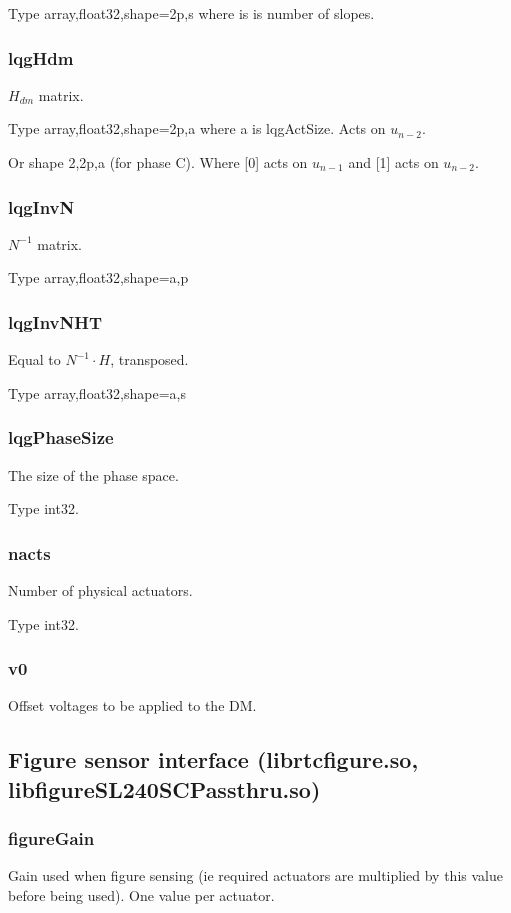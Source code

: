 \documentclass[a4,10pt]{article}
\begin{document}
Type array,float32,shape=2p,s where is is number of slopes.

\subsubsection{lqgHdm}
$H_{dm}$ matrix.

Type array,float32,shape=2p,a where a is lqgActSize.  Acts on $u_{n-2}$.

Or shape 2,2p,a (for phase C). Where [0] acts on $u_{n-1}$ and [1]
acts on $u_{n-2}$.

\subsubsection{lqgInvN}
$N^{-1}$ matrix.

Type array,float32,shape=a,p

\subsubsection{lqgInvNHT}
Equal to $N^{-1}\cdot H$, transposed.

Type array,float32,shape=a,s

\subsubsection{lqgPhaseSize}
The size of the phase space.

Type int32.

\subsubsection{nacts}
Number of physical actuators.

Type int32.

\subsubsection{v0}
Offset voltages to be applied to the DM.




\subsection{Figure sensor interface (librtcfigure.so, libfigureSL240SCPassthru.so)}
\subsubsection{figureGain}
Gain used when figure sensing (ie required actuators are multiplied by
this value before being used).  One value per actuator.
\end{document}
